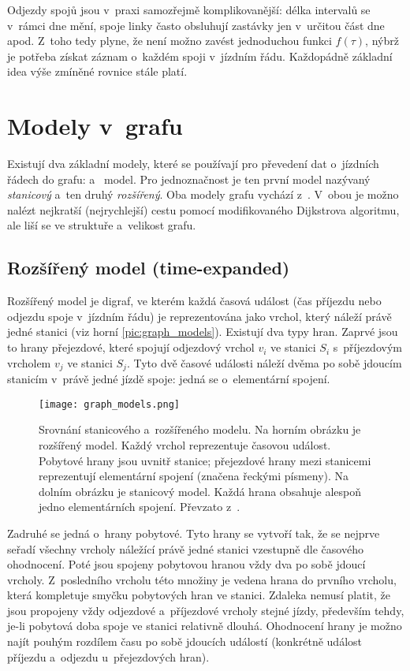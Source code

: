 Odjezdy spojů jsou v~praxi samozřejmě komplikovanější: délka intervalů se v~rámci dne mění, spoje linky často obsluhují zastávky jen v~určitou část dne apod. Z~toho tedy plyne, že není možno zavést jednoduchou funkci $f(\tau)$, nýbrž je potřeba získat záznam o~každém spoji v~jízdním řádu. Každopádně základní idea výše zmíněné rovnice stále platí.

\section{Modely v~grafu}
Existují dva základní modely, které se používají pro převedení dat o~jízdních řádech do grafu:  a~ model. Pro jednoznačnost je ten první model nazývaný \textit{stanicový} a~ten druhý \textit{rozšířený}. Oba modely grafu vychází z~\cite{PYRGA2004TowardsRealistic,pyrga2008efficient}. V~obou je možno nalézt nejkratší (nejrychlejší) cestu pomocí modifikovaného Dijkstrova algoritmu, ale liší se ve struktuře a~velikost grafu.

\renewcommand{\figureautorefname}{obrázek}
\subsection{Rozšířený model (time-expanded)}
Rozšířený model je digraf, ve kterém každá časová událost (čas příjezdu nebo odjezdu spoje v~jízdním řádu) je reprezentována jako vrchol, který náleží právě jedné stanici (viz horní \autoref{pic:graph_models}). Existují dva typy hran. Zaprvé jsou to hrany přejezdové, které spojují odjezdový vrchol $v_i$ ve stanici $S_i$ s~příjezdovým vrcholem $v_j$ ve stanici $S_j$. Tyto dvě časové události náleží dvěma po sobě jdoucím stanicím v~právě jedné jízdě spoje: jedná se o~elementární spojení.

\begin{figure}[htbp]
	\centering
	\texttt{[image: graph\_models.png]}
	\caption[Srovnání stanicového a~rozšířeného modelu.]{Srovnání stanicového a~rozšířeného modelu. Na horním obrázku je rozšířený model. Každý vrchol reprezentuje časovou událost. Pobytové hrany jsou uvnitř stanice; přejezdové hrany mezi stanicemi reprezentují elementární spojení (značena řeckými písmeny). Na dolním obrázku je stanicový model. Každá hrana obsahuje alespoň jedno elementárních spojení. Převzato z~\cite{pyrga2008efficient}.}
	\label{pic:graph_models}
\end{figure}

Zadruhé se jedná o~hrany pobytové. Tyto hrany se vytvoří tak, že se nejprve seřadí všechny vrcholy náležící právě jedné stanici vzestupně dle časového ohodnocení. Poté jsou spojeny pobytovou hranou vždy dva po sobě jdoucí vrcholy. Z~posledního vrcholu této množiny je vedena hrana do prvního vrcholu, která kompletuje smyčku pobytových hran ve stanici. Zdaleka nemusí platit, že jsou propojeny vždy odjezdové a~příjezdové vrcholy stejné jízdy, především tehdy, je-li pobytová doba spoje ve stanici relativně dlouhá. Ohodnocení hrany je možno najít pouhým rozdílem času po sobě jdoucích událostí (konkrétně událost příjezdu a~odjezdu u~přejezdových hran).
\renewcommand{\figureautorefname}{obrázku}
\renewcommand{\subsectionautorefname}{pododdíle}
